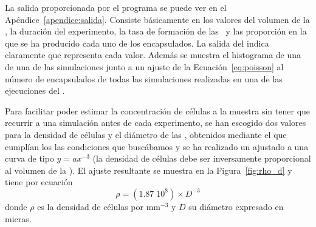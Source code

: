 La salida proporcionada por el programa se puede ver en el Apéndice~\ref{apendice:salida}. Consiste básicamente en los valores del volumen de la \gota, la duración del experimento, la tasa de formación de las \gotas\ y las proporción en la que se ha producido cada uno de los encapsulados. La salida del  indica claramente que representa cada valor. Además se muestra el histograma de una de una de las simulaciones junto a un ajuste de la Ecuación~\ref{eq:poisson} al número de encapsulados de todas las simulaciones realizadas en una de las ejecuciones del .


Para facilitar poder estimar la concentración de células a la muestra sin tener que recurrir a una simulación antes de cada experimento, se han escogido dos valores para la densidad de células y el diámetro de las \gotas, obtenidos mediante el  que cumplían los las condiciones que buscábamos y se ha realizado un ajustado a una curva de tipo $y=ax^{-3}$ (la densidad de células debe ser inversamente proporcional al volumen de la \gota). El ajuste resultante se muestra en la Figura~\ref{fig:rho_d} y tiene por ecuación
\begin{equation}\label{eq:rho}
    \rho=({1.87}\;{10}^{8})\times {D}^{-3}
\end{equation}
donde $\rho$ es la densidad de células por $\mathrm{mm^{-3}}$ y $D$ su diámetro expresado en micras.

